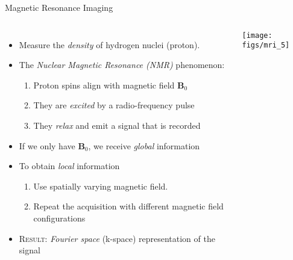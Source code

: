 
\begin{frame}{Magnetic Resonance Imaging}
  \begin{columns}[totalwidth=\linewidth]
      \begin{itemize}
          \item Measure the \textit{density} of hydrogen nuclei (proton).
          \item The \textit{Nuclear Magnetic Resonance (NMR)} phenomenon:
          \begin{enumerate}
              \item Proton spins align with magnetic field $\mathbf{B}_0$
              \item They are \textit{excited} by a radio-frequency pulse
              \item They \textit{relax} and emit a signal that is recorded
          \end{enumerate}
          \vfill\item If we only have $\mathbf{B}_0$, we receive \textit{global} information
          \vfill\item To obtain \textit{local} information
          \begin{enumerate}
              \item Use spatially varying magnetic field.
              \item Repeat the acquisition with different magnetic field configurations
          \end{enumerate} 
          \vfill\item \textsc{Result:} \textit{Fourier space} (k-space) representation of the signal
      \end{itemize}
          \centering
      \texttt{[image: figs/mri\_5]}%
      
  \end{columns}
  
\end{frame}
